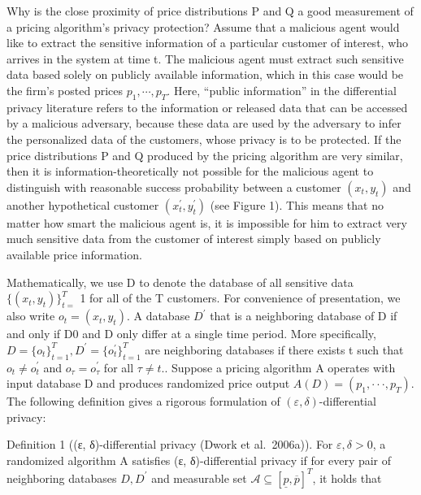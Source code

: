 Why is the close proximity of price distributions P and Q a good measurement of a pricing algorithm's privacy protection? Assume that a malicious agent would like to extract the sensitive information of a particular customer of interest, who arrives in the system at time t. The malicious agent must extract such sensitive data based solely on publicly available information, which in this case would be the firm's posted prices \(p _ { 1 } , \cdots , p _ { T }\). Here, ``public information'' in the differential privacy literature refers to the information or released data that can be accessed by a malicious adversary, because these data are used by the adversary to infer the personalized data of the customers, whose privacy is to be protected. If the price distributions P and Q produced by the pricing algorithm are very similar, then it is information-theoretically not possible for the malicious agent to distinguish with reasonable success probability between a customer \(( x _ { t } , y _ { t } )\) and another hypothetical customer \(( x _ { t } ^ { \prime } , y _ { t } ^ { \prime } )\) (see Figure 1). This means that no matter how smart the malicious agent is, it is impossible for him to extract very much sensitive data from the customer of interest simply based on publicly available price information.

Mathematically, we use D to denote the database of all sensitive data \(\{ ( x _ { t } , y _ { t } ) \} _ { t = } ^ { T }\) 1 for all of the T customers. For convenience of presentation, we also write \(o _ { t } = ( x _ { t } , y _ { t } )\). A database \(D ^ { \prime }\) that is a neighboring database of D if and only if D0 and D only differ at a single time period. More specifically, \(D = \{ o _ { t } \} _ { t = 1 } ^ { T } , D ^ { \prime } = \{ o _ { t } ^ { \prime } \} _ { t = 1 } ^ { T }\) are neighboring databases if there exists t such that \(o _ { t } \neq o _ { t } ^ { \prime }\) and \(o _ { \tau } = o _ { \tau } ^ { \prime }\) for all \(\tau \neq t .\). Suppose a pricing algorithm A operates with input database D and produces randomized price output \(A ( D ) = ( p _ { 1 } , \cdot \cdot \cdot , p _ { T } )\). The following definition gives a rigorous formulation of \(( \varepsilon , \delta )\)-differential privacy:

Definition 1 ((ε, δ)-differential privacy (Dwork et al.~2006a)). For \(\varepsilon , \delta > 0\), a randomized algorithm A satisfies (ε, δ)-differential privacy if for every pair of neighboring databases \(D , D ^ { \prime }\) and measurable set \(\mathcal { A } \subseteq [ \underline { { p } } , \overline { { p } } ] ^ { T }\), it holds that

